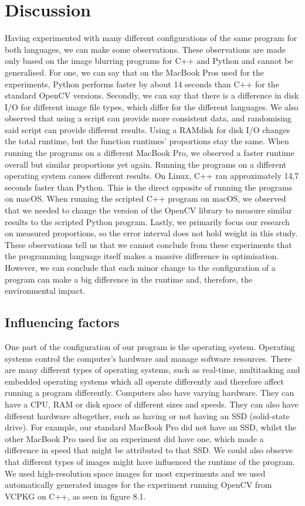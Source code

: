 \chapter{Discussion}
Having experimented with many different configurations of the same program for both languages, we can make some observations. These observations are made only based on the image blurring programs for C++ and Python and cannot be generalised.
For one, we can say that on the MacBook Pros used for the experiments, Python performs faster by about 14 seconds than C++ for the standard OpenCV versions. Secondly, we can say that there is a difference in disk I/O for different image file types, which differ for the different languages. We also observed that using a script can provide more consistent data, and randomising said script can provide different results. Using a RAMdisk for disk I/O changes the total runtime, but the function runtimes' proportions stay the same. When running the programs on a different MacBook Pro, we observed a faster runtime overall but similar proportions yet again. Running the programs on a different operating system causes different results. On Linux, C++ ran approximately 14,7 seconds faster than Python. This is the direct opposite of running the programs on macOS. When running the scripted C++ program on macOS, we observed that we needed to change the version of the OpenCV library to measure similar results to the scripted Python program. Lastly, we primarily focus our research on measured proportions, so the error interval does not hold weight in this study.
These observations tell us that we cannot conclude from these experiments that the programming language itself makes a massive difference in optimisation. However, we can conclude that each minor change to the configuration of a program can make a big difference in the runtime and, therefore, the environmental impact.

\section{Influencing factors}
One part of the configuration of our program is the operating system. Operating systems control the computer’s hardware and manage software resources. There are many different types of operating systems, such as real-time, multitasking and embedded operating systems which all operate differently and therefore affect running a program differently.
Computers also have varying hardware. They can have a CPU, RAM or disk space of different sizes and speeds. They can also have different hardware altogether, such as having or not having an SSD (solid-state drive). For example, our standard MacBook Pro did not have an SSD, whilst the other MacBook Pro used for an experiment did have one, which made a difference in speed that might be attributed to that SSD.
We could also observe that different types of images might have influenced the runtime of the program. We used high-resolution space images for most experiments and we used automatically generated images for the experiment running OpenCV from VCPKG on C++, as seen in figure 8.1.

